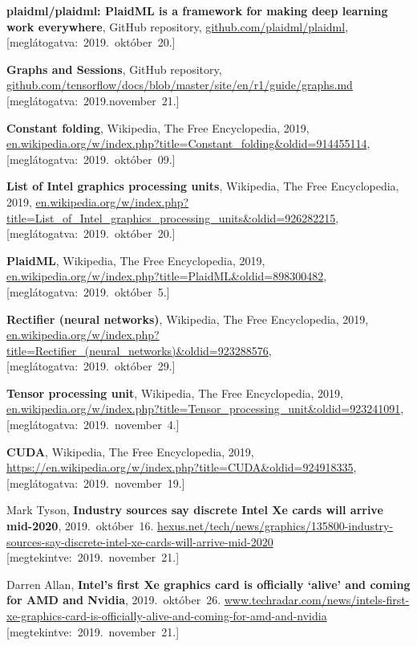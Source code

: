 \begin{thebibliography}{9}
	\textbf{plaidml/plaidml: PlaidML is a framework for making deep learning work everywhere},
	GitHub repository,
	{\footnotesize\url{github.com/plaidml/plaidml}},
	\mbox{[meglátogatva:~2019.~október~20.]}

	\textbf{Graphs and Sessions},
	GitHub repository,
	{\footnotesize\url{github.com/tensorflow/docs/blob/master/site/en/r1/guide/graphs.md}}
	\mbox{[meglátogatva:~2019.november~21.]}

	\textbf{Constant folding},
	{Wikipedia}{,} The Free Encyclopedia,
	2019,
	{\footnotesize\url{en.wikipedia.org/w/index.php?title=Constant_folding&oldid=914455114}},
	\mbox{[meglátogatva:~2019.~október~09.]}

	\textbf{List of Intel graphics processing units},
	{Wikipedia}{,} The Free Encyclopedia,
	2019,
	{\footnotesize\url{en.wikipedia.org/w/index.php?title=List_of_Intel_graphics_processing_units&oldid=926282215}},
	\mbox{[meglátogatva:~2019.~október~20.]}

	\textbf{PlaidML},
	{Wikipedia}{,} The Free Encyclopedia,
	2019,
	{\footnotesize\url{en.wikipedia.org/w/index.php?title=PlaidML&oldid=898300482}},
	\mbox{[meglátogatva:~2019.~október~5.]}

	\textbf{Rectifier (neural networks)},
	{Wikipedia}{,} The Free Encyclopedia,
	2019,
	{\footnotesize\url{ en.wikipedia.org/w/index.php?title=Rectifier_(neural_networks)&oldid=923288576}},
	\mbox{[meglátogatva:~2019.~október~29.]}

	\textbf{Tensor processing unit},
	{Wikipedia}{,} The Free Encyclopedia,
	2019,
	{\footnotesize\url{en.wikipedia.org/w/index.php?title=Tensor_processing_unit&oldid=923241091}},
	\mbox{[meglátogatva:~2019.~november~4.]}

	\textbf{CUDA},
	{Wikipedia}{,} The Free Encyclopedia,
	2019,
	{\footnotesize\url{https://en.wikipedia.org/w/index.php?title=CUDA&oldid=924918335}},
	\mbox{[meglátogatva:~2019.~november~19.]}

	Mark Tyson,
	\textbf{Industry sources say discrete Intel Xe cards will arrive mid-2020},
	2019.~október~16.
	{\footnotesize\url{hexus.net/tech/news/graphics/135800-industry-sources-say-discrete-intel-xe-cards-will-arrive-mid-2020}}
	[megtekintve:~2019.~november~21.]

	Darren Allan,
	\textbf{Intel’s first Xe graphics card is officially ‘alive’ and coming for AMD and Nvidia},
	2019.~október~26.
	{\footnotesize\url{www.techradar.com/news/intels-first-xe-graphics-card-is-officially-alive-and-coming-for-amd-and-nvidia}}
	[megtekintve:~2019.~november~21.]


\end{thebibliography}
